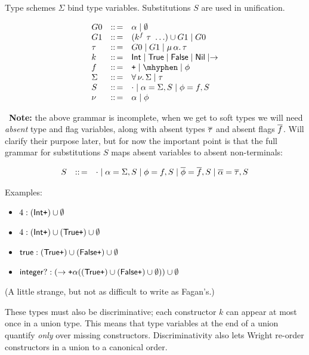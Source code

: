 \documentclass{article}
\begin{document}
Type schemes $\Sigma$ bind type variables.
Substitutions $S$ are used in unification.

\[\begin{array}{l c l}
   G0 & \coloneq & \alpha \mid \emptyset
\\ G1 & \coloneq & (k^f~\tau~\ldots) \cup G1 \mid G0
\\ \tau & \coloneq & G0 \mid G1 \mid \trec{\alpha}{\tau}
\\ k & \coloneq & \tint \mid \ttrue \mid \tfalse \mid \tnil \mid \rightarrow
\\ f & \coloneq & \fplus \mid \fminus \mid \phi
\\ \Sigma & \coloneq & \tall{\nu}{\Sigma} \mid \tau
\\ S & \coloneq & \cdot \mid \alpha = \Sigma,S \mid \phi = f, S
\\ \nu & \coloneq & \alpha \mid \phi
  \end{array}\]

\noindent \leafNE~\textbf{Note:} the above grammar is incomplete,
 when we get to soft types we will need \emph{absent} type and flag variables,
  along with absent types $\overline{\tau}$ and absent flags $\overline{f}$.
 Will clarify their purpose later, but for now the important point is that
  the full grammar for substitutions $S$ maps absent variables to absent non-terminals:

 \[\begin{array}{l c l}
    S & ::\,= & \cdot \mid \alpha = \Sigma,S \mid \phi = f, S \mid \overline{\phi} = \overline{f}, S \mid \overline{\alpha} = \overline{\tau}, S
 \end{array}\]

Examples:
\begin{itemize}
\item
  $4 : (\mathsf{Int} \texttt{+}) \cup \emptyset$
\item
  $4 : (\mathsf{Int} \texttt{+}) \cup (\mathsf{True} \texttt{+}) \cup \emptyset$
\item
  $\mathsf{true} : (\mathsf{True} \texttt{+}) \cup (\mathsf{False} \texttt{+}) \cup \emptyset$
\item
  $\mathsf{integer?} : (\rightarrow \texttt{+} \alpha ((\mathsf{True} \texttt{+}) \cup (\mathsf{False} \texttt{+}) \cup \emptyset)) \cup \emptyset$
\end{itemize}

(A little strange, but not as difficult to write as Fagan's.)

These types must also be discriminative; each constructor $k$ can appear at most
 once in a union type.
This means that type variables at the end of a union quantify \emph{only} over
 missing constructors.
Discriminativity also lets Wright re-order constructors in a union to a canonical order.
\end{document}
